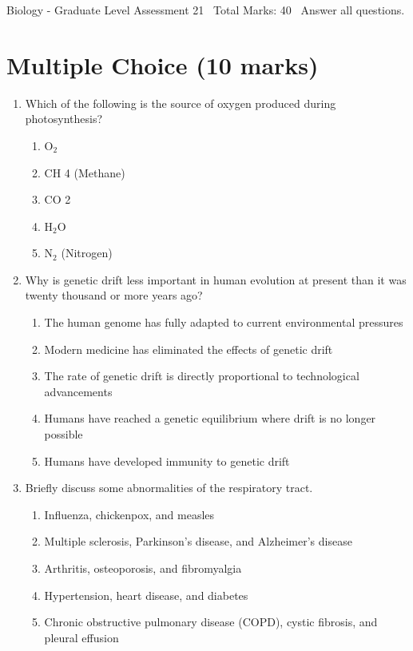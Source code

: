 \documentclass[12pt]{article}
\begin{document}
\begin{center}
Biology - Graduate Level Assessment 21 \
Total Marks: 40 \
Answer all questions.
\end{center}

\section*{Multiple Choice (10 marks)}
\begin{enumerate}[label=\arabic*.]
\item Which of the following is the source of oxygen produced during photosynthesis?
\begin{enumerate}[label=(\alph*)]
    \item O$_{2}$
    \item CH 4 (Methane)
    \item CO 2
    \item H$_{2}$O
    \item N$_{2}$ (Nitrogen)
\end{enumerate}
\item Why is genetic drift less important in human evolution at present than it was twenty thousand or more years ago?
\begin{enumerate}[label=(\alph*)]
    \item The human genome has fully adapted to current environmental pressures
    \item Modern medicine has eliminated the effects of genetic drift
    \item The rate of genetic drift is directly proportional to technological advancements
    \item Humans have reached a genetic equilibrium where drift is no longer possible
    \item Humans have developed immunity to genetic drift
\end{enumerate}
\item Briefly discuss some abnormalities of the respiratory tract.
\begin{enumerate}[label=(\alph*)]
    \item Influenza, chickenpox, and measles
    \item Multiple sclerosis, Parkinson's disease, and Alzheimer's disease
    \item Arthritis, osteoporosis, and fibromyalgia
    \item Hypertension, heart disease, and diabetes
    \item Chronic obstructive pulmonary disease (COPD), cystic fibrosis, and pleural effusion

\end{enumerate}
\end{enumerate}
\end{document}
